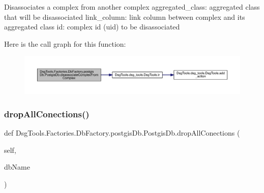 \begin{DoxyVerb}Disassociates a complex from another complex
aggregated_class: aggregated class that will be disassociated
link_column: link column between complex and its aggregated class
id: complex id (uid) to be disassociated
\end{DoxyVerb}
 Here is the call graph for this function\+:
\nopagebreak
\begin{figure}[H]
\begin{center}
\leavevmode
\includegraphics[width=350pt]{class_dsg_tools_1_1_factories_1_1_db_factory_1_1postgis_db_1_1_postgis_db_ae4430782ffd26a5abaf3ba2ca8fd96c5_cgraph}
\end{center}
\end{figure}
\mbox{\label{class_dsg_tools_1_1_factories_1_1_db_factory_1_1postgis_db_1_1_postgis_db_a6dd38e550a884054ab70550fcd714c32}} 
\subsubsection{\texorpdfstring{drop\+All\+Conections()}{dropAllConections()}}
{\footnotesize\ttfamily def Dsg\+Tools.\+Factories.\+Db\+Factory.\+postgis\+Db.\+Postgis\+Db.\+drop\+All\+Conections (\begin{DoxyParamCaption}\item[{}]{self,  }\item[{}]{db\+Name }\end{DoxyParamCaption})}

